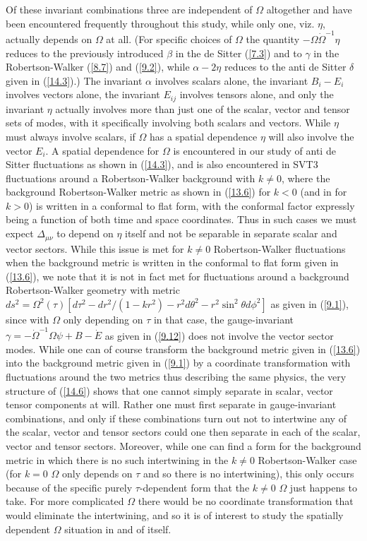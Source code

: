 Of these invariant combinations three are independent of $\Omega$ altogether and have been encountered frequently throughout this study, while only one, viz. $\eta$, actually depends on $\Omega$ at all. (For specific choices of $\Omega$ the quantity $-\Omega\dot{\Omega}^{-1}\eta$ reduces to the previously introduced $\beta$ in the de Sitter (\ref{7.3}) and to $\gamma$ in the Robertson-Walker (\ref{8.7}) and (\ref{9.2}), while $\alpha-2\eta$ reduces to the anti de Sitter $\delta$ given in (\ref{14.3}).) The invariant $\alpha$ involves scalars alone, the invariant $B_i-E_i$ involves vectors alone, the invariant $E_{ij}$  involves tensors alone, and only the invariant $\eta$ actually involves more than just one of the scalar, vector and tensor sets of modes, with it specifically involving both scalars and vectors. While $\eta$ must always involve scalars, if $\Omega$ has a spatial dependence $\eta$ will also involve the vector $E_i$. A spatial dependence for $\Omega$ is  encountered in our study of anti de Sitter fluctuations as shown in (\ref{14.3}), and is also encountered in SVT3 fluctuations around a Robertson-Walker background with $k\neq 0$,  where the background Robertson-Walker metric as shown in (\ref{13.6}) for $k<0$ (and in \cite{amarasinghe_2019} for $k>0$) is written in a conformal to flat form, with the conformal factor expressly being a function of both time and space coordinates. Thus in such cases we must expect $\Delta_{\mu\nu}$ to depend on $\eta$ itself and not be separable in separate scalar and vector sectors. While this issue is met for $k\neq 0$ Robertson-Walker fluctuations when the background metric is written in the conformal to flat form given in (\ref{13.6}), we note that it is not in fact met for fluctuations around a background Robertson-Walker geometry with metric $ds^2=\Omega^2(\tau)[d\tau^2-dr^2/(1-kr^2)-r^2d\theta^2-r^2\sin^2\theta d\phi^2]$ as given in (\ref{9.1}), since with $\Omega$ only depending on $\tau$ in that case, the gauge-invariant $\gamma = - \dot\Omega^{-1}\Omega \psi + B - \dot E$ as given in (\ref{9.12}) does not involve the vector sector modes. While one can of course transform the background metric given in (\ref{13.6}) into the background metric given in (\ref{9.1}) by a coordinate transformation with fluctuations around the two metrics thus describing the same physics, the very structure of (\ref{14.6}) shows that one cannot simply separate in scalar, vector tensor components at will. Rather one must first separate in gauge-invariant combinations, and only if these combinations turn out not to intertwine any of the scalar, vector and tensor sectors could one then separate in each of the scalar, vector and tensor sectors. Moreover, while one can find a form for the background metric in which there is no such intertwining in the $k\neq 0$ Robertson-Walker case (for $k=0$ $\Omega$ only depends on $\tau$ and so there is no intertwining), this only occurs because of the specific purely $\tau$-dependent form that  the $k\neq 0$ $\Omega$ just happens to take.  For more complicated $\Omega$ there would be no coordinate transformation that would eliminate the intertwining, and so it is of interest to study the spatially dependent $\Omega$ situation in and of itself.


